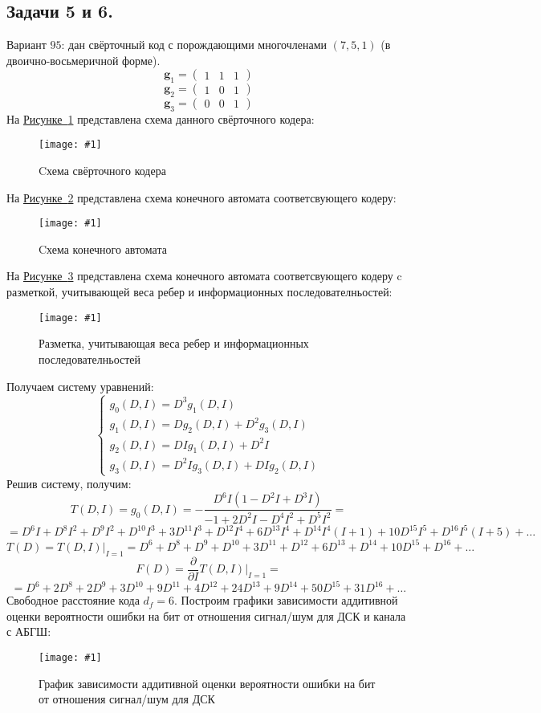 \documentclass{article}
\newcommand{\inlref}[2]{\hyperref[#2]{#1~\ref*{#2}}}
\newcommand{\image}[3]{%
    \begin{figure}[H]
        \centering
        \texttt{[image: \#1]}
        \caption{#2}
        \label{img:#1}
    \end{figure}
}
\begin{document}
\subsection{Задачи 5 и 6.}
%
Вариант $95$: дан свёрточный код с порождающими многочленами $(7,5,1)$ (в двоично-восьмеричной форме).
$$\boldsymbol{g}_{1}=\begin{pmatrix}
1 & 1 & 1
\end{pmatrix}$$
$$\boldsymbol{g}_{2}=\begin{pmatrix}
1 & 0 & 1
\end{pmatrix}$$
$$\boldsymbol{g}_{3}=\begin{pmatrix}
0 & 0 & 1
\end{pmatrix}$$
На \inlref{Рисунке}{img:conv_scheme.png} представлена схема данного свёрточного кодера:
\image {conv_scheme.png} {Cхема свёрточного кодера} {0.5\textwidth}
На \inlref{Рисунке}{img:automat_scheme.png} представлена схема конечного автомата соответсвующего кодеру:
\image {automat_scheme.png} {Cхема конечного автомата} {0.2\textwidth}
%
На \inlref{Рисунке}{img:auto_di_scheme.png} представлена схема конечного автомата соответсвующего кодеру c разметкой, учитывающей
веса ребер и информационных последователньостей:
\image {auto_di_scheme.png} {Разметка, учитывающая веса ребер и информационных последователньостей} {0.2\textwidth}
%
Получаем систему уравнений:
$$\begin{cases}
g_{0}(D, I)=D^{3}g_{1}(D, I) \\
g_{1}(D, I)=Dg_{2}(D, I) + D^{2}g_{3}(D, I) \\
g_{2}(D, I)=DIg_{1}(D, I) + D^{2}I \\
g_{3}(D, I)=D^{2}Ig_{3}(D, I) + DIg_{2}(D, I)
\end{cases}$$
Решив систему, получим:
$$T(D, I) = g_{0}(D,I) = -\frac{D^{6} I (1 - D^{2} I + D^{3} I)}{-1 + 2 D^{2} I - D^{4} I^{2} + D^{5} I^{2}}=$$
$$
=D^{6} I + D^{8} I^{2} + D^{9} I^{2} + D^{10} I^{3} + 3 D^{11} I^{3} + D^{12} I^{4} + 6 D^{13} I^{4} + D^{14} I^{4} (I + 1) + 10 D^{15} I^{5} + D^{16} I^{5} (I + 5) + \ldots
$$
$$
T(D)=T(D,I)|_{I=1}=
D^{6} + D^{8} + D^{9} + D^{10} + 3 D^{11} + D^{12} + 6 D^{13} + D^{14} + 10 D^{15} + D^{16} + \ldots$$
$$F(D)=\frac{\partial}{\partial I}T(D,I)|_{I=1}=$$
$$=D^{6} + 2 D^{8} + 2 D^{9} + 3 D^{10} + 9 D^{11} + 4 D^{12} + 24 D^{13}  + 9 D^{14} + 50 D^{15} + 31 D^{16} + \ldots$$
Свободное расстояние кода $d_{f}=6$.
%
Построим графики зависимости аддитивной оценки вероятности ошибки на бит от отношения сигнал/шум для ДСК и канала с АБГШ:
\image {DSK.png} {График зависимости аддитивной оценки вероятности ошибки на бит от отношения сигнал/шум для ДСК} {0.6\textwidth}
\end{document}

